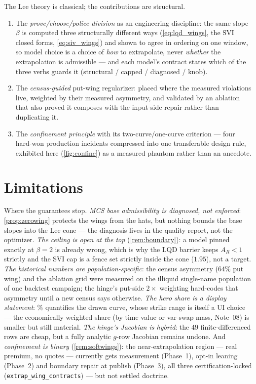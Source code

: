 \documentclass[11pt]{article}
\newcommand{\AR}{A_R}
\begin{document}
The Lee theory is classical; the contributions are structural.
\begin{enumerate}[leftmargin=1.6em]
\item The \emph{prove/choose/police division} as an engineering
discipline: the same slope $\beta$ is computed three structurally
different ways (\eqref{eq:lqd_wings}, the SVI closed forms,
\eqref{eq:siv_wings}) and shown to agree in ordering on one window, so
model choice is a choice of \emph{how} to extrapolate, never
\emph{whether} the extrapolation is admissible --- and each model's
contract states which of the three verbs guards it (structural / capped
/ diagnosed / knob).
\item The \emph{census-guided} put-wing regularizer: placed where the
measured violations live, weighted by their measured asymmetry, and
validated by an ablation that also proved it composes with the
input-side repair rather than duplicating it.
\item The \emph{confinement principle} with its two-curve/one-curve
criterion --- four hard-won production incidents compressed into one
transferable design rule, exhibited here (\cref{fig:confine}) as a
measured phantom rather than an anecdote.
\end{enumerate}

\section{Limitations}
\label{sec:limits}

Where the guarantees stop.  \emph{MCS base admissibility is diagnosed,
not enforced}: \cref{prop:zerowing} protects the wings from the hats,
but nothing bounds the base slopes into the Lee cone --- the diagnosis
lives in the quality report, not the optimizer.  \emph{The ceiling is
open at the top} (\cref{rem:boundary}): a model pinned exactly at
$\beta=2$ is already wrong, which is why the LQD barrier keeps
$\AR<1$ strictly and the SVI cap is a fence set strictly inside the cone
($1.95$), not a target.  \emph{The
historical numbers are population-specific}: the census asymmetry
($64\%$ put wing) and the ablation grid were measured on the illiquid
single-name population of one backtest campaign; the hinge's put-side
$2\times$ weighting hard-codes that asymmetry until a new census says
otherwise.  \emph{The hero share is a display statement}:
\wlqheroextrapshare\% quantifies the drawn curve, whose strike range is
itself a UI choice --- the economically weighted share (by time value or
var-swap mass, Note~08) is smaller but still material.  \emph{The
hinge's Jacobian is hybrid}: the $49$ finite-differenced rows are cheap,
but a fully analytic $g$-row Jacobian remains undone.  And
\emph{confinement is binary} (\cref{rem:softwings}): the
near-extrapolation region --- real premium, no quotes --- currently gets
measurement (Phase~1), opt-in leaning (Phase~2) and boundary repair at
publish (Phase~3), all three certification-locked
(\texttt{extrap\_wing\_contracts}) --- but not settled
doctrine.
\end{document}
